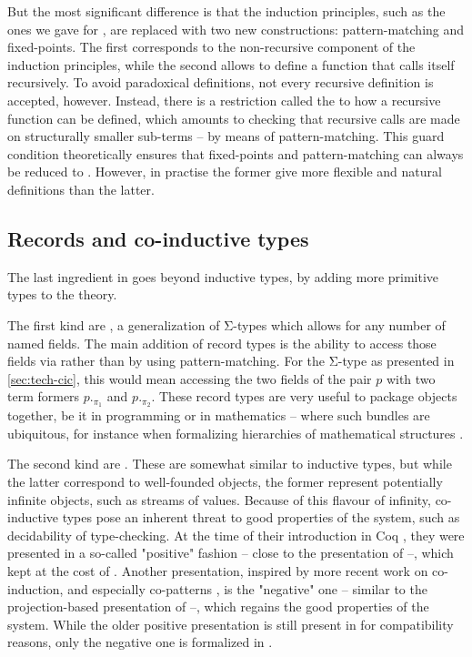 But the most significant difference is that the induction principles,
such as the ones we gave for ,
are replaced with two new constructions: pattern-matching and fixed-points. The
first corresponds to the non-recursive component of the induction principles, while the
second allows to define a function that calls itself recursively.
To avoid paradoxical definitions, not every recursive definition is accepted, however.
\AP Instead, there is a restriction called the 
to how a recursive function
can be defined, which amounts to checking that recursive calls are made on
structurally smaller sub-terms – by means of pattern-matching. This guard condition
theoretically ensures that fixed-points and pattern-matching can always be reduced to
 . However, in practise the former give more
flexible and natural definitions than the latter.

\subsection{Records and co-inductive types}

The last ingredient in  goes beyond inductive types, by adding more primitive types
to the theory.

\AP The first kind are ,
a generalization of Σ-types which allows for any number of
named fields. The main addition of record types is the ability to access those fields via
 rather than by using pattern-matching. For the Σ-type as presented in
\cref{sec:tech-cic}, this would mean accessing the two fields of the pair $p$ with two
term formers $p._{\pi_{1}}$ and $p._{\pi_{2}}$. These record types are very useful to package
objects together, be it in programming or in mathematics – where such bundles are ubiquitous,
for instance when formalizing hierarchies of mathematical structures .

\AP The second kind are .
These are somewhat similar to inductive types, but
while the latter correspond to well-founded objects, the former represent
potentially infinite objects, such as streams of values. Because of this flavour of infinity,
co-inductive types pose an inherent threat to good properties of the system, such as
decidability of type-checking. At the time of their introduction in Coq
, they were presented in a so-called "positive" fashion – close
to the presentation of  –, which
kept  at the cost of .
Another presentation, inspired by more recent work on
co-induction, and especially co-patterns , is the "negative" one –
similar to the projection-based presentation of  –,
which regains the good properties of the system. While the older positive presentation
is still present in  for compatibility reasons,
only the negative one is formalized in .
